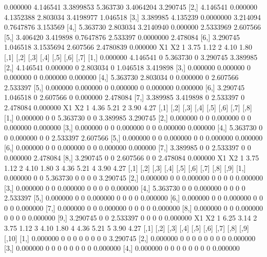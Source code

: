 \documentclass[a4paper, 12pt]{article}
\begin{document}
\begin{itemize}
\begin{Schunk}
\begin{Soutput}
         [,1]     [,2]      [,3]     [,4]      [,5]     [,6]
[1,] 0.000000 4.146541 3.3899853 5.363730 3.4064204 3.290745
[2,] 4.146541 0.000000 4.1352388 2.803034 3.4198977 1.046518
[3,] 3.389985 4.135239 0.0000000 3.214094 0.7647876 3.153569
[4,] 5.363730 2.803034 3.2140940 0.000000 2.5333969 2.607566
[5,] 3.406420 3.419898 0.7647876 2.533397 0.0000000 2.478084
[6,] 3.290745 1.046518 3.1535694 2.607566 2.4780839 0.000000
    X1   X2
1 3.75 1.12
2 4.10 1.80
         [,1]     [,2] [,3]     [,4] [,5]     [,6]     [,7]
[1,] 0.000000 4.146541    0 5.363730    0 3.290745 3.389985
[2,] 4.146541 0.000000    0 2.803034    0 1.046518 3.419898
[3,] 0.000000 0.000000    0 0.000000    0 0.000000 0.000000
[4,] 5.363730 2.803034    0 0.000000    0 2.607566 2.533397
[5,] 0.000000 0.000000    0 0.000000    0 0.000000 0.000000
[6,] 3.290745 1.046518    0 2.607566    0 0.000000 2.478084
[7,] 3.389985 3.419898    0 2.533397    0 2.478084 0.000000
    X1   X2
1 4.36 5.21
2 3.90 4.27
         [,1] [,2] [,3]     [,4] [,5] [,6]     [,7]     [,8]
[1,] 0.000000    0    0 5.363730    0    0 3.389985 3.290745
[2,] 0.000000    0    0 0.000000    0    0 0.000000 0.000000
[3,] 0.000000    0    0 0.000000    0    0 0.000000 0.000000
[4,] 5.363730    0    0 0.000000    0    0 2.533397 2.607566
[5,] 0.000000    0    0 0.000000    0    0 0.000000 0.000000
[6,] 0.000000    0    0 0.000000    0    0 0.000000 0.000000
[7,] 3.389985    0    0 2.533397    0    0 0.000000 2.478084
[8,] 3.290745    0    0 2.607566    0    0 2.478084 0.000000
    X1   X2
1 3.75 1.12
2 4.10 1.80
3 4.36 5.21
4 3.90 4.27
          [,1] [,2] [,3]     [,4] [,5] [,6] [,7] [,8]     [,9]
 [1,] 0.000000    0    0 5.363730    0    0    0    0 3.290745
 [2,] 0.000000    0    0 0.000000    0    0    0    0 0.000000
 [3,] 0.000000    0    0 0.000000    0    0    0    0 0.000000
 [4,] 5.363730    0    0 0.000000    0    0    0    0 2.533397
 [5,] 0.000000    0    0 0.000000    0    0    0    0 0.000000
 [6,] 0.000000    0    0 0.000000    0    0    0    0 0.000000
 [7,] 0.000000    0    0 0.000000    0    0    0    0 0.000000
 [8,] 0.000000    0    0 0.000000    0    0    0    0 0.000000
 [9,] 3.290745    0    0 2.533397    0    0    0    0 0.000000
    X1   X2
1 6.25 3.14
2 3.75 1.12
3 4.10 1.80
4 4.36 5.21
5 3.90 4.27
          [,1] [,2] [,3] [,4] [,5] [,6] [,7] [,8] [,9]    [,10]
 [1,] 0.000000    0    0    0    0    0    0    0    0 3.290745
 [2,] 0.000000    0    0    0    0    0    0    0    0 0.000000
 [3,] 0.000000    0    0    0    0    0    0    0    0 0.000000
 [4,] 0.000000    0    0    0    0    0    0    0    0 0.000000

\end{Soutput}
\end{Schunk}
\end{itemize}
\end{document}
